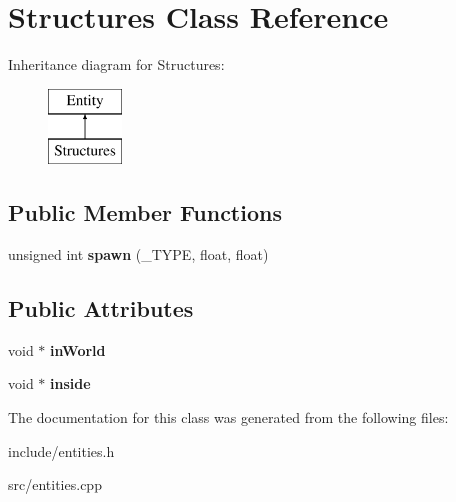 \hypertarget{classStructures}{}\section{Structures Class Reference}
\label{classStructures}
Inheritance diagram for Structures\+:\begin{figure}[H]
\begin{center}
\leavevmode
\includegraphics[height=2.000000cm]{classStructures}
\end{center}
\end{figure}
\subsection*{Public Member Functions}
\begin{DoxyCompactItemize}
\item 
\hypertarget{classStructures_a410e68c77b77b9fa61b3dd48a1069dd3}{}unsigned int {\bfseries spawn} (\+\_\+\+T\+Y\+P\+E, float, float)\label{classStructures_a410e68c77b77b9fa61b3dd48a1069dd3}

\end{DoxyCompactItemize}
\subsection*{Public Attributes}
\begin{DoxyCompactItemize}
\item 
\hypertarget{classStructures_a99b0d24ff339519aa0580761829f3d94}{}void $\ast$ {\bfseries in\+World}\label{classStructures_a99b0d24ff339519aa0580761829f3d94}

\item 
\hypertarget{classStructures_a2de8aa35c7d21ca33af056634e34f1c9}{}void $\ast$ {\bfseries inside}\label{classStructures_a2de8aa35c7d21ca33af056634e34f1c9}

\end{DoxyCompactItemize}


The documentation for this class was generated from the following files\+:\begin{DoxyCompactItemize}
\item 
include/entities.\+h\item 
src/entities.\+cpp\end{DoxyCompactItemize}
